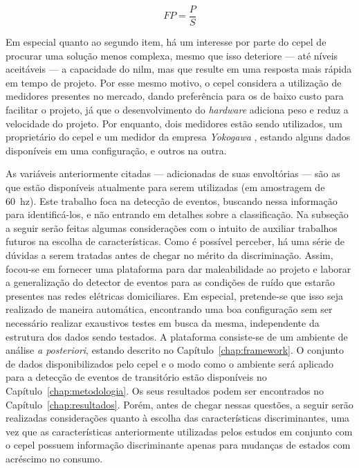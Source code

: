 \begin{equation} \label{eq:fp}
FP = \frac{P}{S}
\end{equation}

Em especial quanto ao segundo item, há um interesse por parte do
\gls{cepel} de procurar uma solução menos complexa, mesmo
que isso deteriore --- até níveis aceitáveis --- a capacidade do
\gls{nilm}, mas que resulte em uma resposta mais rápida em tempo de
projeto. Por esse mesmo motivo, o \gls{cepel} considera a utilização
de medidores presentes no mercado, dando preferência para os de baixo
custo para facilitar o projeto, já que o desenvolvimento do
\emph{hardware} adiciona peso e reduz a velocidade do projeto. Por
enquanto, dois medidores estão sendo utilizados, um proprietário do
\acs{cepel} e um medidor da empresa \emph{Yokogawa}
\cite{yokogawa_medidor}, estando alguns dados disponíveis em uma
configuração, e outros na outra.

As variáveis anteriormente citadas --- adicionadas de suas envoltórias
--- são as que estão disponíveis atualmente para serem utilizadas (em
amostragem de 60~\acs{hz}).  Este trabalho foca na detecção de
eventos, buscando nessa informação para identificá-los, e não entrando
em detalhes sobre a classificação.  Na subseção a seguir serão feitas
algumas considerações com o intuito de auxiliar trabalhos futuros na
escolha de características. Como é possível perceber, há uma série de
dúvidas a serem tratadas antes de chegar no mérito da discriminação.
Assim, focou-se em fornecer uma plataforma para dar maleabilidade ao
projeto e laborar a generalização do detector de eventos para as
condições de ruído que estarão presentes nas redes elétricas
domiciliares. Em especial, pretende-se que isso seja realizado de
maneira automática, encontrando uma boa configuração sem ser
necessário realizar exaustivos testes em busca da mesma, independente
da estrutura dos dados sendo testados. A plataforma consiste-se de um
ambiente de análise \emph{a posteriori}, estando descrito no
Capítulo~\ref{chap:framework}. O conjunto de dados disponibilizados
pelo \acs{cepel} e o modo como o ambiente será aplicado para a
detecção de eventos de transitório estão disponíveis no
Capítulo~\ref{chap:metodologia}. Os seus resultados podem ser
encontrados no Capítulo~\ref{chap:resultados}. Porém, antes de chegar
nessas questões, a seguir serão realizadas considerações quanto à
escolha das características discriminantes, uma vez que as
características anteriormente utilizadas pelos estudos em conjunto com
o \acs{cepel} possuem informação discriminante apenas para mudanças de
estados com acréscimo no consumo.

